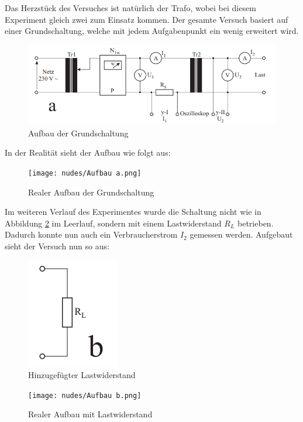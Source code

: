 \documentclass[12pt,a4paper,twoside]{article}
\begin{document}
Das Herzstück des Versuches ist natürlich der Trafo, wobei bei diesem Experiment gleich zwei zum Einsatz kommen. Der gesamte Versuch basiert auf einer Grundschaltung, welche mit jedem Aufgabenpunkt ein wenig erweitert wird.

    \begin{figure}[H]
        \centering
        \includegraphics[width=0.6\linewidth, angle=0]{nudes/Versuchsaufbau a.png}
        \caption{Aufbau der Grundschaltung \cite{teachcenter2}}
        \label{fig:AufbauDerGrundschaltung}
    \end{figure}

\noindent
In der Realität sieht der Aufbau wie folgt aus:

\begin{figure}[H]
    \centering
    \texttt{[image: nudes/Aufbau a.png]}
    \caption{Realer Aufbau der Grundschaltung}
    \label{fig:RealerAufbauDerGrundschaltung}
\end{figure}

\noindent
Im weiteren Verlauf des Experimentes wurde die Schaltung nicht wie in Abbildung \ref{fig:RealerAufbauDerGrundschaltung} im Leerlauf, sondern mit einem Lastwiderstand $R_{L}$ betrieben. Dadurch konnte nun auch ein Verbraucherstrom $I_{2}$ gemessen werden. Aufgebaut sieht der Versuch nun so aus:

\begin{figure}[H]
    \centering
    \includegraphics[width=0.2\linewidth, angle=0]{nudes/Versuchsaufbau b.png}
    \caption{Hinzugefügter Lastwiderstand \cite{teachcenter2}}
    \label{fig:AufbauB}
\end{figure}

\begin{figure}[H]
    \centering
    \texttt{[image: nudes/Aufbau b.png]}
    \caption{Realer Aufbau mit Lastwiderstand}
    \label{fig:RealerAufbauB}
\end{figure}
\end{document}
